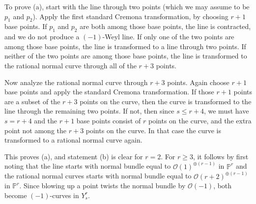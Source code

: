 \documentclass[12pt]{article}
\numberwithin{equation}{section}
\numberwithin{subeq}{equation}
\begin{document}
\medskip{}
To prove (a), start with the line through two points (which we may assume to be $p_1$ and $p_2$).
Apply the first standard Cremona transformation, by choosing $r+1$ base points.
If $p_1$ and $p_2$ are both among those base points, the line is contracted, and we do not produce a $(-1)$-Weyl line.
If only one of the two points are among those base points, the line is transformed to a line through two points.
If neither of the two points are among those base points, the line is transformed to the rational normal curve through all of the $r+3$ points.

Now analyze the rational normal curve through $r+3$ points.  
Again choose $r+1$ base points and apply the standard Cremona transformation.
If those $r+1$ points are a subset of the $r+3$ points on the curve,
then the curve is transformed to the line through the remaining two points.
If not, then since $s \leq r+4$, we must have $s=r+4$
and the $r+1$ base points consist of $r$ points on the curve,
and the extra point not among the $r+3$ points on the curve.
In that case the curve is transformed to a rational normal curve again.

This proves (a), and statement (b) is clear for $r=2$.
For $r\geq 3$, it follows by first noting that
the line starts with normal bundle equal to $\mathcal{O}(1)^{\oplus(r-1)}$ in $\mathbb{P}^r$
and the rational normal curves starts with normal bundle equal to $\mathcal{O}(r+2)^{\oplus(r-1)}$ in $\mathbb{P}^r$.
Since blowing up a point twists the normal bundle by $\mathcal{O}(-1)$, 
both become $(-1)$-curves in $Y^r_s$.

 
\end{document}
